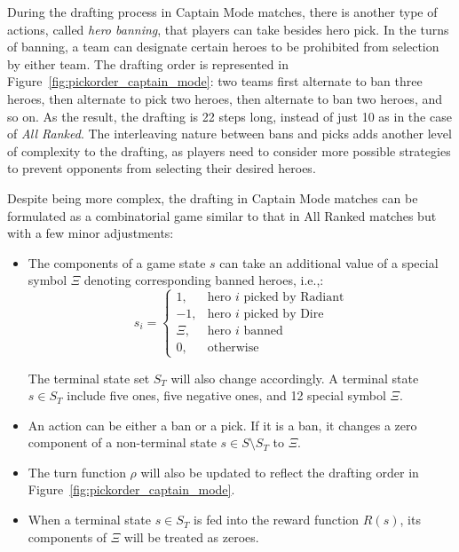 During the drafting process in Captain Mode matches, there is another type of actions, called \textit{hero banning}, that players can take besides hero pick. In the turns of banning, a team can designate certain heroes to be prohibited from selection by either team. The drafting order is represented in Figure~\ref{fig:pickorder_captain_mode}: two teams first alternate to ban three heroes, then alternate to pick two heroes, then alternate to ban two heroes, and so on. As the result, the drafting is 22 steps long, instead of just 10 as in the case of \textit{All Ranked}. The interleaving nature between bans and picks adds another level of complexity to the drafting, as players need to consider more possible strategies to prevent opponents from selecting their desired heroes. 

Despite being more complex, the drafting in Captain Mode matches can be formulated as a combinatorial game similar to that in All Ranked matches but with a few minor adjustments:

\begin{itemize}[leftmargin=*]
    \item The components of a game state $s$ can take an additional value of a special symbol $\Xi$ denoting corresponding banned heroes, i.e.,:
\begin{equation}
s_{i}=
\begin{cases}
  1, & \text{hero } i \text{ picked by Radiant} \\
  -1, & \text{hero } i \text{ picked by Dire} \\
  \Xi, & \text{hero }i \text{ banned} \\
  0, & \text{otherwise}
\end{cases}
\label{eqn:sifeature}
\end{equation}

The terminal state set $S_T$ will also change accordingly. A terminal state $s \in S_T$ include five ones, five negative ones, and 12 special symbol $\Xi$.

    \item An action can be either a ban or a pick. If it is a ban, it changes a zero component of a non-terminal state $s \in S \setminus S_T$ to $\Xi$. 
    \item The turn function $\rho$ will also be updated to reflect the drafting order in Figure~\ref{fig:pickorder_captain_mode}.
    \item When a terminal state $s \in S_T$ is fed into the reward function $R(s)$, its components of $\Xi$ will be treated as zeroes.
\end{itemize}

